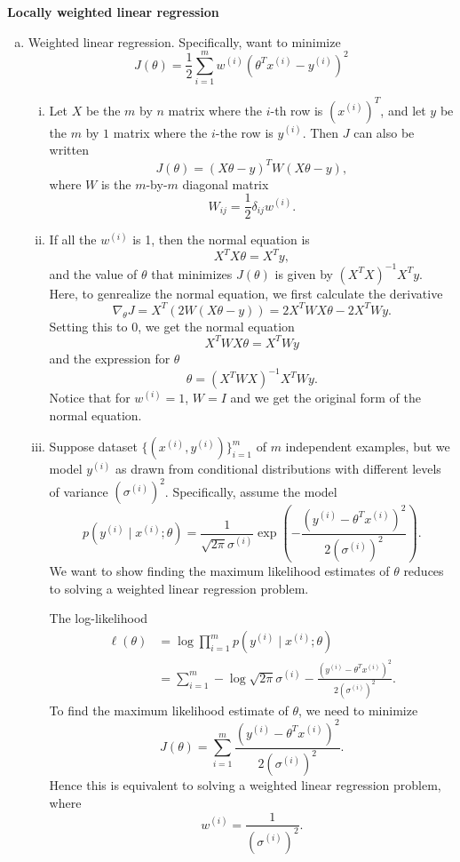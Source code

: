 \documentclass[12pt,letterpaper,boxed]{hmcpset}
\newcommand{\yy}{y^{(i)}}
\newcommand{\xx}{x^{(i)}}
\newcommand{\ww}{w^{(i)}}
\renewcommand{\ss}{\sigma^{(i)}}
\begin{document}
\begin{problem}[Problem 5]
  \textbf{Locally weighted linear regression}
\end{problem}
\begin{solution}
\begin{enumerate}[(a)]
  \item Weighted linear regression. Specifically, want to minimize
  \[
  J(\theta) = \frac{1}{2} \sum_{i=1}^m \ww (\theta^T \xx - \yy)^2
  \]
  \begin{enumerate}[i.]
    \item Let $X$ be the $m$ by $n$ matrix where the $i$-th row is $(\xx)^T$, and let $y$ be the $m$ by $1$ matrix where the $i$-the row is $\yy$. Then $J$ can also be written
    \[
    J(\theta) = (X\theta - y)^T W (X \theta - y),
    \]
    where $W$ is the $m$-by-$m$ diagonal matrix
    \[
    W_{ij} = \frac{1}{2} \delta_{ij} \ww.
    \]

    \item If all the $\ww$ is 1, then the normal equation is
    \[
    X^T X \theta = X^T y,
    \]
    and the value of $\theta$ that minimizes $J(\theta)$ is given by $(X^T X)^{-1} X^T y$. Here, to genrealize the normal equation, we first calculate the derivative
    \[
    \nabla_{\theta} J = X^T (2W(X \theta - y)) = 2X^T W X \theta - 2X^T W y.
    \]
    Setting this to 0, we get the normal equation
    \[
    X^T W X \theta = X^T W y
    \]
    and the expression for $\theta$
    \[
    \theta = (X^T W X)^{-1} X^T W y.
    \]
    Notice that for $\ww = 1$, $W = I$ and we get the original form of the normal equation.

    \item Suppose dataset $\{(\xx, \yy)\}_{i=1}^m$ of $m$ independent examples, but we model $\yy$ as drawn from conditional distributions with different levels of variance $(\ss)^2$. Specifically, assume the model
    \[
    p(\yy \mid \xx ; \theta) = \frac{1}{\sqrt{2\pi} \ss} \exp(-\frac{(\yy - \theta^T \xx)^2}{2(\ss)^2}).
    \]
    We want to show finding the maximum likelihood estimates of $\theta$ reduces to solving a weighted linear regression problem.

    The log-likelihood
    \[
    \begin{aligned}
      \ell (\theta) &= \log \prod_{i=1}^m p(\yy \mid \xx; \theta) \\
      &= \sum_{i=1}^{m} -\log \sqrt{2\pi} \ss - \frac{(\yy - \theta^T \xx)^2}{2(\ss)^2}.
    \end{aligned}
    \]
    To find the maximum likelihood estimate of $\theta$, we need to minimize
    \[
    J(\theta) = \sum_{i=1}^{m} \frac{(\yy - \theta^T \xx)^2}{2(\ss)^2}.
    \]
    Hence this is equivalent to solving a weighted linear regression problem, where
    \[
    \ww = \frac{1}{(\ss)^2}.
    \]
  \end{enumerate}


\end{enumerate}
\end{solution}
\end{document}
